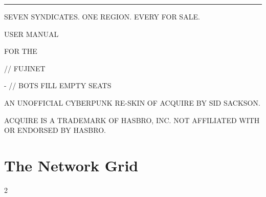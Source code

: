 \documentclass[12pt,letterpaper]{article}
\begin{document}
\begin{titlepage}
\machine
\vspace*{1.6in}
{\color{amber}\rule{\linewidth}{2pt}}\par\vspace{14pt}
{\fontsize{44}{48}\selectfont \game\par}\vspace{10pt}
{\fontsize{12}{16}\selectfont\color{steel} SEVEN SYNDICATES. ONE REGION. EVERY \MakeUppercase{} FOR SALE.\par}
\vspace{14pt}{\color{amber}\rule{\linewidth}{2pt}}\par
\vspace{0.35in}
{\fontsize{24}{30}\selectfont USER MANUAL\par}\vspace{4pt}
{\fontsize{14}{18}\selectfont\color{amber} FOR THE \MakeUppercase{\PlatformLong}\par}
\vspace{0.4in}
{\fontsize{12}{16}\selectfont \PlatformMachines \quad // \quad FUJINET\par
{}- \MakeUppercase{} \quad // \quad BOTS FILL EMPTY SEATS\par}
\vfill
{\fontsize{8.5}{11}\selectfont\color{steel}
AN UNOFFICIAL CYBERPUNK RE-SKIN OF ACQUIRE BY SID SACKSON.\par
ACQUIRE IS A TRADEMARK OF HASBRO, INC. NOT AFFILIATED WITH OR ENDORSED BY HASBRO.\par}
\end{titlepage}

\renewcommand{\secstatus}{THE SETTING \quad // \quad THE OBJECT \quad // \quad THE END}
\chapter{The Network Grid}
\begin{multicols}{2}
\end{multicols}

\renewcommand{\secstatus}{REGION \quad // \quad STATUS \quad // \quad HANDLE}
\end{document}
